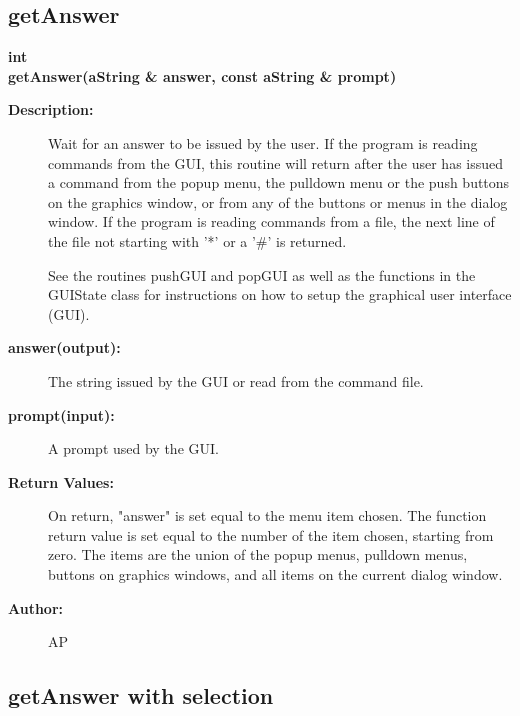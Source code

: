 \subsection{getAnswer}
 
\begin{flushleft} \textbf{%
int  \\ 
\settowidth{\GLGraphicsInterfaceIncludeArgIndent}{getAnswer(}%
getAnswer(aString \& answer, const aString \& prompt)
}\end{flushleft}
\begin{description}
\item[{\bf Description:}] 
  Wait for an answer to be issued by the user. If the program is reading commands from 
  the GUI, this routine will return after the user has issued a command from the popup 
  menu, the pulldown menu or the push buttons on the graphics window, or from any of 
  the buttons or menus in the dialog window. If the program is reading commands from a
  file, the next line of the file not starting with '*' or a '\#' is returned.

  See the routines pushGUI and popGUI as well as the functions in the GUIState class
  for instructions on how to setup the graphical user interface (GUI).

\item[{\bf answer(output):}]  The string issued by the GUI or read from the command file.
\item[{\bf prompt(input):}]  A prompt used by the GUI.
\item[{\bf Return Values:}]  On return, "answer" is set equal to the 
    menu item chosen. The function return value is set equal to
    the number of the item chosen, starting from zero. The items are the union of the
    popup menus, pulldown menus, buttons on graphics windows, and all items on the 
    current dialog window.

\item[{\bf Author:}]  AP
\end{description}
\subsection{getAnswer with selection}
 
